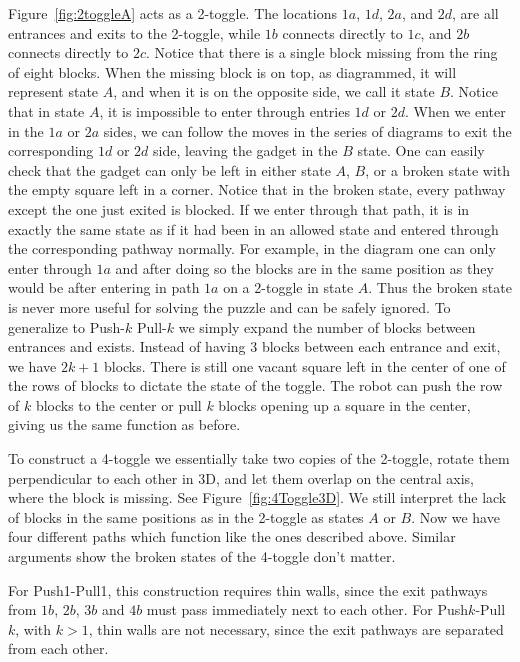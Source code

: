 Figure~\ref{fig:2toggleA} acts as a 2-toggle. The locations $1a$, $1d$, $2a$, and $2d$, are all entrances and exits to the 2-toggle, while $1b$ connects directly to $1c$, and $2b$ connects directly to $2c$. Notice that there is a single block missing from the ring of eight blocks. When the missing block is on top, as diagrammed, it will represent state $A$, and when it is on the opposite side, we call it state $B$. Notice that in state $A$, it is impossible to enter through entries $1d$ or $2d$. When we enter in the $1a$ or $2a$ sides, we can follow the moves in the series of diagrams to exit the corresponding $1d$ or $2d$ side, leaving the gadget in the $B$ state. One can easily check that the gadget can only be left in either state $A$, $B$, or a broken state with the empty square left in a corner. Notice that in the broken state, every pathway except the one just exited is blocked. If we enter through that path, it is in exactly the same state as if it had been in an allowed state and entered through the corresponding pathway normally. For example, in the diagram one can only enter through $1a$ and after doing so the blocks are in the same position as they would be after entering in path $1a$ on a 2-toggle in state $A$. Thus the broken state is never more useful for solving the puzzle and can be safely ignored. To generalize to Push-$k$ Pull-$k$ we simply expand the number of blocks between entrances and exists. Instead of having $3$ blocks between each entrance and exit, we have $2k+1$ blocks. There is still one vacant square left in the center of one of the rows of blocks to dictate the state of the toggle. The robot can push the row of $k$ blocks to the center or pull $k$ blocks opening up a square in the center, giving us the same function as before.

To construct a 4-toggle we essentially take two copies of the 2-toggle, rotate them perpendicular to each other in 3D, and let them overlap on the central axis, where the block is missing. See Figure~\ref{fig:4Toggle3D}. We still interpret the lack of blocks in the same positions as in the 2-toggle as states $A$ or $B$. Now we have four different paths which function like the ones described above. Similar arguments show the broken states of the 4-toggle don't matter.

For Push1-Pull1, this construction requires thin walls, since the exit pathways from $1b$, $2b$, $3b$ and $4b$ must pass immediately next to each other. For Push$k$-Pull$k$, with $k > 1$, thin walls are not necessary, since the exit pathways are separated from each other.

